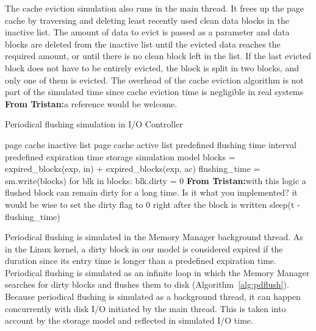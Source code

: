 \documentclass[conference]{IEEEtran}
\newcommand{\Desc}[2]{\State \makebox[2em][l]{#1}#2}
\newcommand{\tristan}[1]{\color{orange}\textbf{From Tristan:}#1\color{black}}
\begin{document}
    The cache eviction simulation also runs in
    the main thread. It frees up the page cache by traversing and deleting
    least recently used clean data blocks in the inactive list.
    The amount of data to evict is passed as a parameter and data blocks are deleted
    from the inactive list until the evicted data reaches the required amount,
    or until there is no clean block left in the list.
    If the last evicted block does not have to be entirely evicted, the block is split in two blocks,
    and only one of them is evicted.
    The overhead of the cache eviction algorithm is not part of the simulated time
    since cache eviction time is negligible in real systems \tristan{a reference would be welcome}.

    \begin{algorithm}\caption{Periodical flushing simulation in I/O Controller}\label{alg:pdflush}
        \small
        \begin{algorithmic}[1]
            \Input
                \Desc{in}{page cache inactive list}
                \Desc{ac}{page cache active list}
                \Desc{t}{predefined flushing time interval}
                \Desc{exp}{predefined expiration time}
                \Desc{sm}{storage simulation model}
               \EndInput
                \State blocks = expired\_blocks(exp, in) + expired\_blocks(exp, ac)
                \State flushing\_time = sm.write(blocks)
                \State for blk in blocks: blk.dirty = 0 \tristan{with this logic a flushed block can remain dirty for a long time. Is it what you implemented?
                it would be wise to set the dirty flag to 0 right after the block is written}
                    \State sleep(t - flushing\_time)
                \EndIf  %
            \EndWhile
        \end{algorithmic}
    \end{algorithm}

    Periodical flushing is simulated in the Memory Manager
    background thread. As in the Linux kernel, a dirty block
    in our model is considered expired if
    the duration since its entry time is longer than a
    predefined expiration time.
    Periodical flushing is simulated as an infinite loop in which
    the Memory Manager searches for dirty blocks and flushes them to disk (Algorithm~\ref{alg:pdflush}).
    Because periodical flushing is simulated as a background thread, it can happen concurrently
    with disk I/O initiated by the main thread. This is taken into account by the
    storage model and reflected in simulated I/O time.
\end{document}

